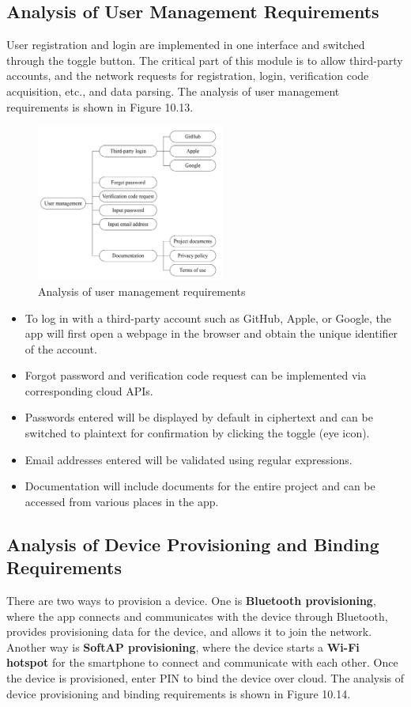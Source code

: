 \documentclass[a4paper,12pt,openany]{book}
\begin{document}
\subsection{Analysis of User Management Requirements}
User registration and login are implemented in one interface and switched through the toggle button. The critical part of this module is to allow third-party accounts, and the network requests for registration, login, verification code acquisition, etc., and data parsing. The analysis of user management requirements is shown in Figure 10.13.

\begin{figure}[ht]
    \centering
    \includegraphics[width=0.55\textwidth]{D10Z/10-13}
    \caption{Analysis of user management requirements}
\end{figure}

\begin{itemize}
    \item To log in with a third-party account such as GitHub, Apple, or Google, the app will first open a webpage in the browser and obtain the unique identifier of the account.
    \item Forgot password and verification code request can be implemented via corresponding cloud APIs.
    \item Passwords entered will be displayed by default in ciphertext and can be switched to plaintext for confirmation by clicking the toggle (eye icon).
    \item Email addresses entered will be validated using regular expressions.
    \item Documentation will include documents for the entire project and can be accessed from various places in the app.
\end{itemize}

\subsection{Analysis of Device Provisioning and Binding Requirements}
There are two ways to provision a device. One is \textbf{Bluetooth provisioning}, where the app connects and communicates with the device through Bluetooth, provides provisioning data for the device, and allows it to join the network. Another way is \textbf{SoftAP provisioning}, where the device starts a \textbf{Wi-Fi hotspot} for the smartphone to connect and communicate with each other. Once the device is provisioned, enter PIN to bind the device over cloud. The analysis of device provisioning and binding requirements is shown in Figure 10.14.
\end{document}
